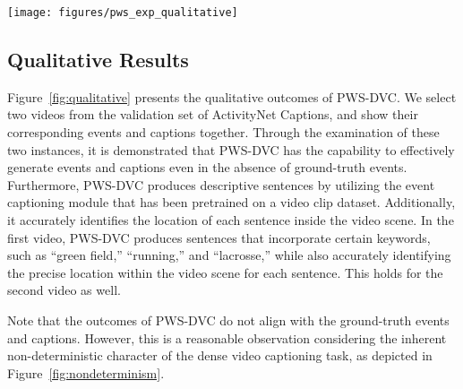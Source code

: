 \begin{sidewaysfigure}
    \centering
    \texttt{[image: figures/pws\_exp\_qualitative]}
    \caption{Examples of the output of PWS-DVC for two videos from the ActivityNet Captions validation set.}
    \label{fig:qualitative}
\end{sidewaysfigure}


\subsection{Qualitative Results}
Figure~\ref{fig:qualitative} presents the qualitative outcomes of PWS-DVC.
We select two videos from the validation set of ActivityNet Captions, and show their corresponding events and captions together.
Through the examination of these two instances, it is demonstrated that PWS-DVC has the capability to effectively generate events and captions even in the absence of ground-truth events.
Furthermore, PWS-DVC produces descriptive sentences by utilizing the event captioning module that has been pretrained on a video clip dataset.
Additionally, it accurately identifies the location of each sentence inside the video scene.
In the first video, PWS-DVC produces sentences that incorporate certain keywords, such as ``green field,'' ``running,'' and ``lacrosse,'' while also accurately identifying the precise location within the video scene for each sentence.
This holds for the second video as well.

Note that the outcomes of PWS-DVC do not align with the ground-truth events and captions.
However, this is a reasonable observation considering the inherent non-deterministic character of the dense video captioning task, as depicted in Figure~\ref{fig:nondeterminism}.

